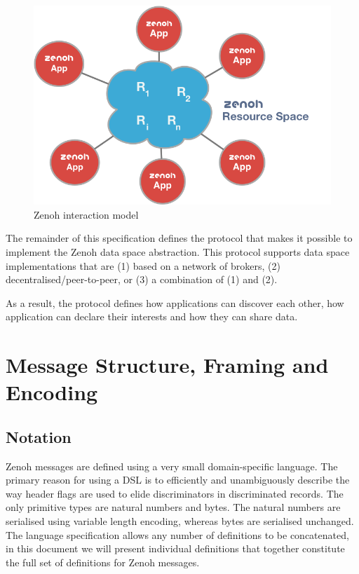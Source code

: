 \documentclass[a4paper,oneside,article]{memoir}
\begin{document}
\begin{figure}
  \centering
  \includegraphics[scale=0.5]{zenoh-interaction-model.png}
  \caption{Zenoh interaction model}\label{fig:interaction-model}
\end{figure}

The remainder of this specification defines the protocol that makes it possible to implement the Zenoh
data space abstraction.  This protocol supports data space implementations that are (1) based on a
network of brokers, (2) decentralised/peer-to-peer, or (3) a combination of (1) and (2).

As a result, the protocol defines how applications can discover each other, how application can
declare their interests and how they can share data.

\chapter{Message Structure, Framing and Encoding}

\section{Notation}

Zenoh messages are defined using a very small domain-specific language.  The primary reason for using
a DSL is to efficiently and unambiguously describe the way header flags are used to elide
discriminators in discriminated records.  The only primitive types are natural numbers and
bytes. The natural numbers are serialised using variable length encoding, whereas bytes are
serialised unchanged.  The language specification allows any number of definitions to be
concatenated, in this document we will present individual definitions that together constitute the
full set of definitions for Zenoh messages.
\end{document}
